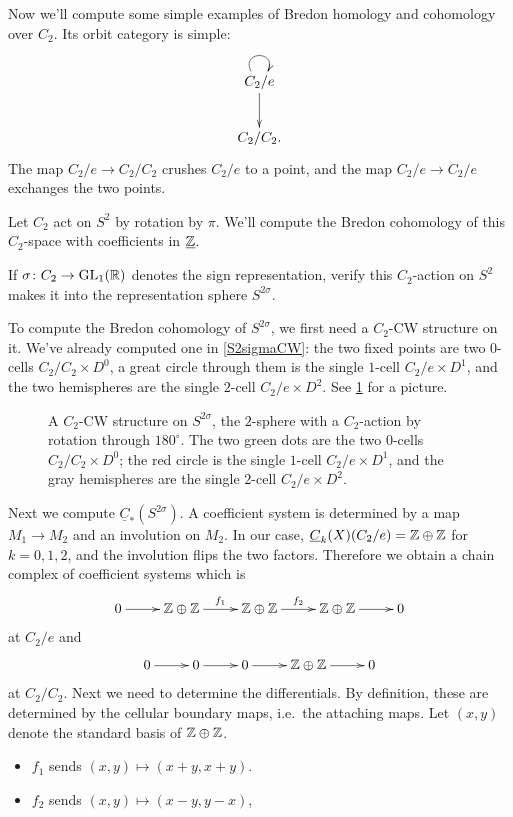 Now we'll compute some simple examples of Bredon homology and cohomology over $C_2$. Its orbit category is simple:
\begin{equation}
\label{C2orbit}
\gathxy{
	C_2/e\ar[d]\ar@(ul, ur)_{}\\
	C_2/C_2.
}
\end{equation}
The map $C_2/e\to C_2/C_2$ crushes $C_2/e$ to a point, and the map $C_2/e\to C_2/e$ exchanges the two points.
\begin{exm}
\label{2sigmaBC}
Let $C_2$ act on $S^2$ by rotation by $\pi$. We'll compute the Bredon cohomology of this $C_2$-space with
coefficients in $\underline{\mathbb Z}$.
\begin{ex}
If $\sigma\colon C_2\to\mathrm{GL}_1(\mathbb R)$ denotes the sign representation, verify this $C_2$-action on $S^2$ makes it into
the representation sphere $S^{2\sigma}$.
\end{ex}
To compute the Bredon cohomology of $S^{2\sigma}$, we first need a $C_2$-CW structure on it. We've already computed
one in \cref{S2sigmaCW}: the two fixed points are two $0$-cells $C_2/C_2\times D^0$, a great circle through them is
the single $1$-cell $C_2/e\times D^1$, and the two hemispheres are the single $2$-cell $C_2/e\times D^2$. See
\cref{S2CWrotation} for a picture.
\begin{figure}[h!]
\caption{A $C_2$-CW structure on $S^{2\sigma}$, the $2$-sphere with a $C_2$-action by rotation through $180^\circ$.
The two green dots are the two $0$-cells $C_2/C_2\times D^0$; the red circle is the single $1$-cell $C_2/e\times
D^1$, and the gray hemispheres are the single $2$-cell $C_2/e\times D^2$.}
\label{S2CWrotation}
\end{figure}

Next we compute $\underline C_*(S^{2\sigma})$. A coefficient system is determined by a map $M_1\to M_2$ and an
involution on $M_2$. In our case, $\underline C_k(X)(C_2/e) = \mathbb Z\oplus\mathbb Z$ for $k = 0,1,2$, and the involution flips
the two factors.  Therefore we obtain a chain complex of coefficient systems which is
\[
\shortexact[f_1][f_2]{\Z\oplus\Z}{\Z\oplus\Z}{\Z\oplus\Z}{}
\]
at $C_2/e$ and
\begin{equation}
\label{C_2/C_2}
\shortexact{0}{0}{\Z\oplus\Z}{}
\end{equation}
at $C_2/C_2$.
Next we need to determine the differentials.  By definition, these are determined by the cellular boundary maps, i.e.\ the attaching maps. Let $(x,y)$ denote the standard basis of $\mathbb Z\oplus\mathbb Z$.
\begin{itemize}
	\item $f_1$ sends $(x,y)\mapsto (x+y, x+y)$.
	\item $f_2$ sends $(x,y)\mapsto (x-y, y-x)$, 
\end{itemize}


\end{exm}
